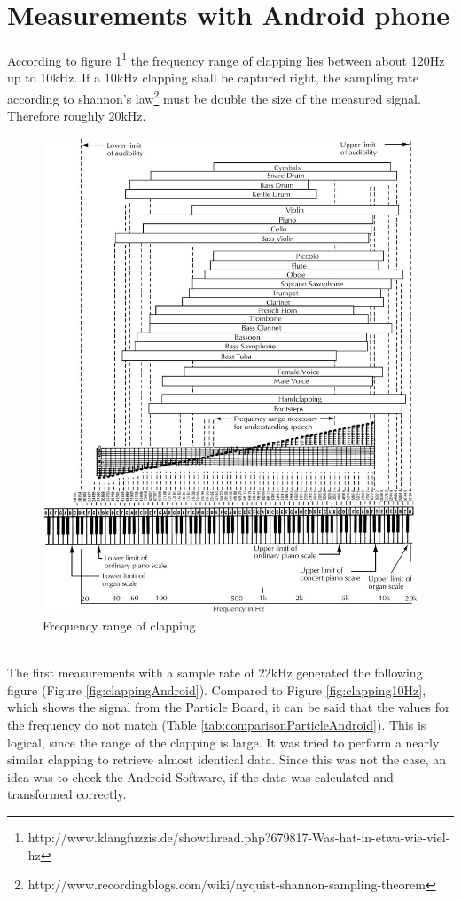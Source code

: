 \section{Measurements with Android phone}
According to figure \ref{fig:clappingFreqBereich}\footnote{http://www.klangfuzzis.de/showthread.php?679817-Was-hat-in-etwa-wie-viel-hz} the frequency range of clapping lies between about 120Hz up  to 10kHz. If a 10kHz clapping shall be captured right, the sampling rate according to shannon's law\footnote{http://www.recordingblogs.com/wiki/nyquist-shannon-sampling-theorem} must be double the size of the measured signal. Therefore roughly 20kHz.
\begin{figure}[h]
	\centering
	\includegraphics[width=.9\textwidth, trim={0 0 0 5.4cm},clip]{imgs/clappingFreqBereich}
	\caption{Frequency range of clapping}
	\label{fig:clappingFreqBereich}
\end{figure}\\
The first measurements with a sample rate of 22kHz generated the following figure (Figure \ref{fig:clappingAndroid}). Compared to Figure \ref{fig:clapping10Hz}, which shows the signal from the Particle Board, it can be said that the values for the frequency do not match (Table \ref{tab:comparisonParticleAndroid}). This is logical, since the range of the clapping is large. It was tried to perform a nearly similar clapping to retrieve almost identical data. Since this was not the case, an idea was to check the Android Software, if the data was calculated and transformed correctly.\\
